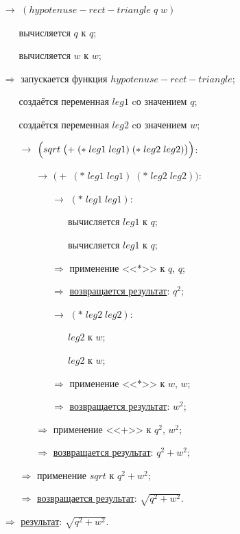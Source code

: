 \begin{itemize}
	\item[$\longrightarrow$] $(hypotenuse\!-\!rect\!-\!triangle\; q\; w)$
	\begin{itemize}
		\item[\textbullet] вычисляется $q$ к $q$;
		\item[\textbullet] вычисляется $w$ к $w$;
	\end{itemize}
	\item[$\Longrightarrow$] запускается функция $hypotenuse\!-\!rect\!-\!triangle$;
	\begin{itemize}
		\item[\textbullet] создаётся переменная $leg1$ cо значением $q$;
		\item[\textbullet] создаётся переменная $leg2$ cо значением $w$;
		\item[$\longrightarrow$] $\Bigl(sqrt\; \bigl(+\; (*\; leg1\; leg1)\; (*\; leg2\; leg2)\bigr)\Bigr)$:
		\begin{itemize}
			\item[$\longrightarrow$] $\bigl(+\; (*\; leg1\; leg1)\; (*\; leg2\; leg2)\bigr)$:
			\begin{enumerate}
				\item[$\longrightarrow$] $(*\; leg1\; leg1)$:
				\begin{enumerate}
					\item[\textbullet] вычисляется $leg1$ к $q$;
					\item[\textbullet] вычисляется $leg1$ к $q$;
				\end{enumerate}
				\item[$\Longrightarrow$] применение <<$*$>> к $q$, $q$;
				\item[$\Longrightarrow$] \underline{возвращается результат}: $q^2$;
				\item[$\longrightarrow$] $(*\; leg2\; leg2)$:
				\begin{enumerate}
					\item[\textbullet] $leg2$ к $w$;
					\item[\textbullet] $leg2$ к $w$;
				\end{enumerate}
				\item[$\Longrightarrow$] применение <<$*$>> к $w$, $w$;
				\item[$\Longrightarrow$] \underline{возвращается результат}: $w^2$;
			\end{enumerate}
			\item[$\Longrightarrow$] применение <<$+$>> к $q^2$, $w^2$;
			\item[$\Longrightarrow$] \underline{возвращается результат}: $q^2 + w^2$;
		\end{itemize}
		\item[$\Longrightarrow$] применение $sqrt$ к $q^2 + w^2$;
		\item[$\Longrightarrow$] \underline{возвращается результат}: $\sqrt{q^2 + w^2}$.
	\end{itemize}
	\item[$\Longrightarrow$] \underline{результат}: $\sqrt{q^2 + w^2}$.
\end{itemize}


